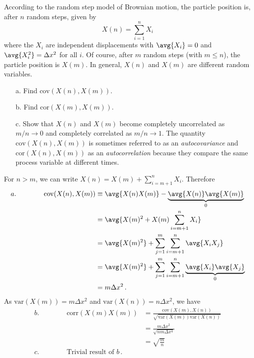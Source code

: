

According to the random step model of Brownian motion, the particle position is, after $n$ random steps, given by
\begin{equation*}
  X(n) = \sum_{i=1}^n X_i
\end{equation*}
where the $X_i$ are independent displacements with $\avg{X_i}=0$ and $\avg{X_i^2} = \Delta x^2$ for all $i$.
Of course, after $m$ random steps (with $m \leq n$), the particle position is $X(m)$.
In general, $X(n)$ and $X(m)$ are different random variables.
\begin{itemize}
  \item[a.] Find $\text{cov}(X(n), X(m))$.
  \item[b.] Find $\text{cor}(X(m), X(m))$.
  \item[c.] Show that $X(n)$ and $X(m)$ become completely uncorrelated as $m/n \to 0$ and completely correlated as $m/n \to 1$.
    The quantity $\text{cov}(X(n), X(m))$ is sometimes referred to as an \textit{autocovariance} and $\text{cor}(X(n), X(m))$ as an \textit{autocorrelation} because they compare the same process variable at different times.
\end{itemize}


For $n > m$, we can write $X(n) = X(m) + \sum_{i=m+1}^n X_i$.
Therefore
\begin{align*}
  a. \qquad \qquad
  \text{cov}(X(n), X(m))
  &\equiv \avg{X(n) X(m)} - \underbrace{\avg{X(n)} \avg{X(m)}}_0 \\
  &= \avg{X(m)^2 + X(m) \sum_{i=m+1}^n X_i} \\
  &= \avg{X(m)^2} + \sum_{j=1}^m \sum_{i=m+1}^n \avg{X_i X_j} \\
  &= \avg{X(m)^2} + \sum_{j=1}^m \sum_{i=m+1}^n \underbrace{\avg{X_i} \avg{X_j}}_0 \\
  &= m \Delta x^2 \, .
\end{align*}
As $\text{var}(X(m)) = m \Delta x^2$ and $\text{var}(X(n)) = n \Delta x^2$, we have
\begin{align*}
  b. \qquad \qquad
  \text{corr}(X(m)X(m))
  &= \frac{\text{cov}(X(m), X(n))}{\sqrt{\text{var}(X(m)) \text{var}(X(n))}} \\
  &= \frac{m\Delta x^2}{\sqrt{nm \Delta x^4}} \\
  &= \sqrt{\frac{m}{n}} \\
  c. \qquad \qquad \text{Trivial result of }b \, .
\end{align*}
